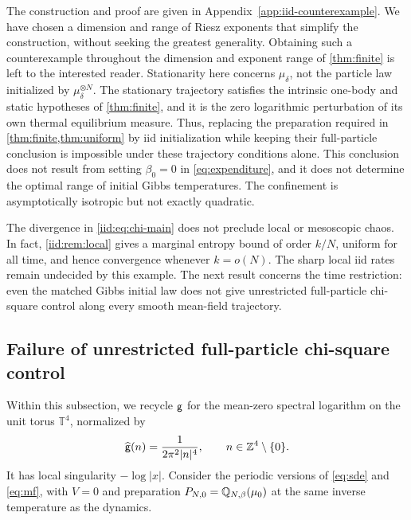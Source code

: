 \documentclass[11pt,reqno]{amsart}
\numberwithin{equation}{section}
\theoremstyle{plain}
\theoremstyle{remark}
\newcommand{\T}{\mathbb T}\newcommand{\R}{\mathbb R}\newcommand{\Z}{\mathbb Z}
\begin{document}
The construction and proof are given in Appendix~\ref{app:iid-counterexample}. We have chosen a dimension and range of Riesz exponents that simplify the construction, without seeking the greatest generality. Obtaining such a counterexample throughout the dimension and exponent range of \cref{thm:finite} is left to the interested reader. Stationarity here concerns $\mu_\delta$, not the particle law initialized by $\mu_\delta^{\otimes N}$. The stationary trajectory satisfies the intrinsic one-body and static hypotheses of \cref{thm:finite}, and it is the zero logarithmic perturbation of its own thermal equilibrium measure. {Thus, replacing the preparation required in \cref{thm:finite,thm:uniform} by iid initialization while keeping their full-particle conclusion is impossible under these trajectory conditions alone.} This conclusion does not result from setting $\beta_0=0$ in \eqref{eq:expenditure}, and it does not determine the optimal range of initial Gibbs temperatures. The confinement is asymptotically isotropic but not exactly quadratic.


The divergence in \eqref{iid:eq:chi-main} does not preclude local or mesoscopic chaos. In fact, \cref{iid:rem:local} gives a marginal entropy bound of order $k/N$, uniform for all time, and hence convergence whenever $k=o(N)$. The sharp local iid rates remain undecided by this example. The next result concerns the time restriction: even the matched Gibbs initial law does not give unrestricted full-particle chi-square control along every smooth mean-field trajectory.

\subsection{Failure of unrestricted full-particle chi-square control}\label{sec:intro-counterexample}

Within this subsection, we recycle $\mathsf g$ for the mean-zero spectral logarithm on the unit torus $\T^4$, normalized by
\begin{equation}\label{eq:periodic-ce-kernel}
 \widehat\g(n)=\frac{1}{2\pi^2|n|^4},\qquad n\in\Z^4\setminus\{0\}.
\end{equation}
It has local singularity $-\log|x|$. Consider the periodic versions of \eqref{eq:sde} and \eqref{eq:mf}, with $V=0$ and preparation $P_{N,0}=\mathbb Q_{N,\beta}(\mu_0)$ at the same inverse temperature as the dynamics.
\end{document}
